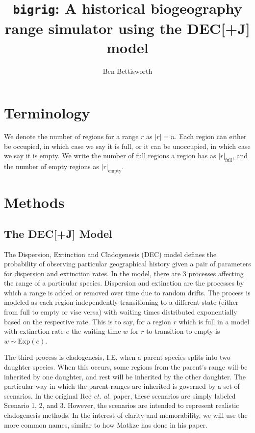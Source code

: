 \documentclass{article}
\title{\texttt{bigrig}: A historical biogeography range simulator using the
  DEC[+J] model}
\author{Ben Bettisworth}
\begin{document}
\newcommand{\CountFull}[1]{|#1|_\text{full}}
\newcommand{\CountEmpty}[1]{|#1|_\text{empty}}

\maketitle

\section{Terminology}

We denote the number of regions for a range \( r \) as \( |r| = n\).
Each region can either be occupied, in which case we say it is full, or it can
be unoccupied, in which case we say it is empty.
We write the number of full regions a region has as \( \CountFull{r} \), and
the number of empty regions as \( \CountEmpty{r} \).

\section{Methods}

\subsection{The DEC[+J] Model} \label{sec:model}

The Dispersion, Extinction and Cladogenesis (DEC) model defines the probability
of observing particular geographical history given a pair of parameters for
dispersion and extinction rates.
In the model, there are 3 processes affecting the range of a particular
species.
Dispersion and extinction are the processes by which a range is added or
removed over time due to random drifts.
The process is modeled as each region independently transitioning to a
different state (either from full to empty or vise versa) with waiting times
distributed exponentially based on the respective rate.
This is to say, for a region \( r \) which is full in a model with extinction
rate \( e \) the waiting time \( w \) for \( r \) to transition to empty is \(
w \sim \text{Exp}(e) \).

The third process is cladogenesis, I.E. when a parent species splits into two
daughter species.
When this occurs, some regions from the parent's range will be inherited by one
daughter, and rest will be inherited by the other daughter.
The particular way in which the parent ranges are inherited is governed by a
set of scenarios.
In the original Ree \textit{et. al.}\cite{ALikelihoodFrReeR2005} paper, these
scenarios are simply labeled Scenario 1, 2, and 3.
However, the scenarios are intended to represent realistic cladogenesis
methods.
In the interest of clarity and memorability, we will use the more common names,
similar to how Matkze \cite{ModelSelectionMatzke2014} has done in his paper.
\end{document}
